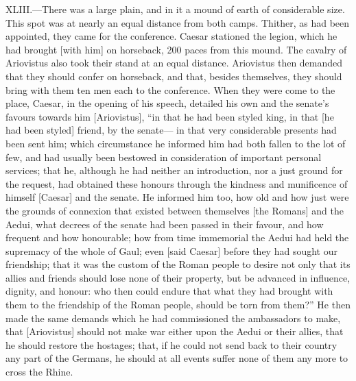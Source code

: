 XLIII.—There was a large plain, and in it a mound of earth of
considerable size. This spot was at nearly an equal distance from both
camps. Thither, as had been appointed, they came for the conference.
Caesar stationed the legion, which he had brought [with him] on
horseback, 200 paces from this mound. The cavalry of Ariovistus also
took their stand at an equal distance. Ariovistus then demanded that
they should confer on horseback, and that, besides themselves, they
should bring with them ten men each to the conference. When they were
come to the place, Caesar, in the opening of his speech, detailed his
own and the senate's favours towards him [Ariovistus], ``in that he had
been styled king, in that [he had been styled] friend, by the senate—
in that very considerable presents had been sent him; which circumstance
he informed him had both fallen to the lot of few, and had usually been
bestowed in consideration of important personal services; that he,
although he had neither an introduction, nor a just ground for the
request, had obtained these honours through the kindness and munificence
of himself [Caesar] and the senate. He informed him too, how old and how
just were the grounds of connexion that existed between themselves [the
Romans] and the Aedui, what decrees of the senate had been passed in
their favour, and how frequent and how honourable; how from time
immemorial the Aedui had held the supremacy of the whole of Gaul; even
[said Caesar] before they had sought our friendship; that it was the
custom of the Roman people to desire not only that its allies and
friends should lose none of their property, but be advanced in
influence, dignity, and honour: who then could endure that what they had
brought with them to the friendship of the Roman people, should be torn
from them?'' He then made the same demands which he had commissioned the
ambassadors to make, that [Ariovistus] should not make war either upon
the Aedui or their allies, that he should restore the hostages; that, if
he could not send back to their country any part of the Germans, he
should at all events suffer none of them any more to cross the Rhine.

